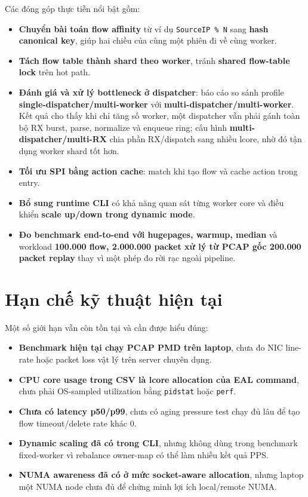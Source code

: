 \documentclass[12pt,a4paper,twoside]{report}
\newcommand{\code}[1]{\texttt{#1}}
\begin{document}
Các đóng góp thực tiễn nổi bật gồm:
\begin{itemize}
    \item \textbf{Chuyển bài toán flow affinity} từ ví dụ \code{SourceIP \% N}
    sang \textbf{hash canonical key}, giúp hai chiều của cùng một phiên đi về
    cùng worker.
    \item \textbf{Tách flow table thành shard theo worker}, tránh
    \textbf{shared flow-table lock} trên hot path.
    \item \textbf{Đánh giá và xử lý bottleneck ở dispatcher}: báo cáo so sánh
    profile \textbf{single-dispatcher/multi-worker} với
    \textbf{multi-dispatcher/multi-worker}. Kết quả cho thấy khi chỉ tăng số
    worker, một dispatcher vẫn phải gánh toàn bộ RX burst, parse, normalize và
    enqueue ring; cấu hình \textbf{multi-dispatcher/multi-RX} chia phần
    RX/dispatch sang nhiều lcore, nhờ đó tận dụng worker shard tốt hơn.
    \item \textbf{Tối ưu SPI bằng action cache}: match khi tạo flow và cache
    action trong entry.
    \item \textbf{Bổ sung runtime CLI} có khả năng quan sát từng worker core và
    điều khiển \textbf{scale up/down trong dynamic mode}.
    \item \textbf{Đo benchmark end-to-end với hugepages, warmup, median} và
    workload \textbf{100.000 flow, 2.000.000 packet xử lý từ PCAP gốc
    200.000 packet replay} thay vì một phép đo rời rạc ngoài pipeline.
\end{itemize}

\section{Hạn chế kỹ thuật hiện tại}
Một số giới hạn vẫn còn tồn tại và cần được hiểu đúng:
\begin{itemize}
    \item \textbf{Benchmark hiện tại chạy PCAP PMD trên laptop}, chưa đo NIC
    line-rate hoặc packet loss vật lý trên server chuyên dụng.
    \item \textbf{CPU core usage trong CSV là lcore allocation của EAL command},
    chưa phải OS-sampled utilization bằng \code{pidstat} hoặc \code{perf}.
    \item \textbf{Chưa có latency p50/p99}, chưa có aging pressure test chạy đủ
    lâu để tạo flow timeout/delete rate khác 0.
    \item \textbf{Dynamic scaling đã có trong CLI}, nhưng không dùng trong
    benchmark fixed-worker vì rebalance owner-map có thể làm nhiễu kết quả PPS.
    \item \textbf{NUMA awareness đã có ở mức socket-aware allocation}, nhưng
    laptop một NUMA node chưa đủ để chứng minh lợi ích local/remote NUMA.
\end{itemize}
\end{document}
